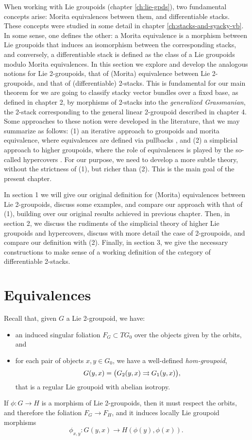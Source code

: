 %
%

When working with Lie groupoids (chapter \ref{ch:lie-gpds}), two fundamental concepts arise: Morita equivalences between them, and differentiable stacks.
These concepts were studied in some detail in chapter \ref{ch:stacks-and-syacky-vb}.
In some sense, one defines the other: a Morita equivalence is a morphism between Lie groupoids that induces an isomorphism between the corresponding stacks,
and conversely, a differentiable stack is defined as the class of a Lie groupoids modulo Morita equivalences.
In this section we explore and develop the analogous notions for Lie 2-groupoids, that of (Morita) equivalence between Lie 2-groupoids, and that of (differentiable) 2-stacks.
This is fundamental for our main theorem for we are going to classify stacky vector bundles over a fixed base, as defined in chapter 2, by morphisms of 2-stacks into the {\it generalized Grassmanian}, the 2-stack corresponding to the general linear 2-groupoid described in chapter 4.
Some approaches to these notion were developed in the literature, that we may summarize as follows: (1) an iterative approach to groupoids and morita equivalence, where equivalences are defined via pullbacks \cite{gs15},
and (2) a simplicial approach to higher groupoids, where the role of equivalences is played by the so-called hypercovers \cite{zhu09}.
For our purpose, we need to develop a more subtle theory, without the strictness of (1), but richer than (2). This is the main goal of the present chapter.

\bigskip

In section 1 we will give our original definition for (Morita) equivalences between Lie 2-groupoids, discuss some examples, and compare our approach with that of (1), building over our original results achieved in previous chapter.
Then, in section 2, we discuss the rudiments of the simplicial theory of higher Lie groupoids and hypercovers, discuss with more detail the case of 2-groupoids, and compare our definition with (2).
Finally, in section 3, we give the necessary constructions to make sense of a working definition of the category of differentiable 2-stacks.


\section{Equivalences}


Recall that, given $G$ a Lie 2-groupoid, we have:
\begin{itemize}
\item an induced singular foliation $F_G\subset TG_0$ over the objects given by the orbits, and
\item for each pair of objects $x,y\in G_0$, we have a well-defined \emph{hom-groupoid},
$$G(y,x)=\big( G_2(y,x)\rightrightarrows G_1(y,x) \big),$$
that is a regular Lie groupoid with abelian isotropy.
\end{itemize}
If $\phi\colon G\to H$ is a morphism of Lie 2-groupoids, then it must respect the orbits, and therefore the foliation $F_G\to F_H$, and it induces locally Lie groupoid morphisms
\[ \phi_{x,y}\colon G(y,x) \to H(\phi(y),\phi(x)). \]

